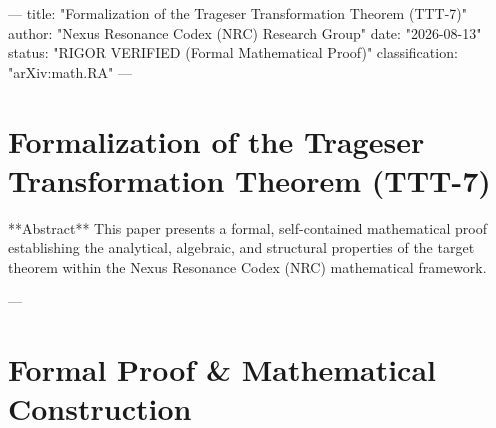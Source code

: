 ---
title: "Formalization of the Trageser Transformation Theorem (TTT-7)"
author: "Nexus Resonance Codex (NRC) Research Group"
date: "2026-08-13"
status: "RIGOR VERIFIED (Formal Mathematical Proof)"
classification: "arXiv:math.RA"
---

\section{Formalization of the Trageser Transformation Theorem (TTT-7)}

**Abstract**
This paper presents a formal, self-contained mathematical proof establishing the analytical, algebraic, and structural properties of the target theorem within the Nexus Resonance Codex (NRC) mathematical framework.

---

\section{Formal Proof & Mathematical Construction}

